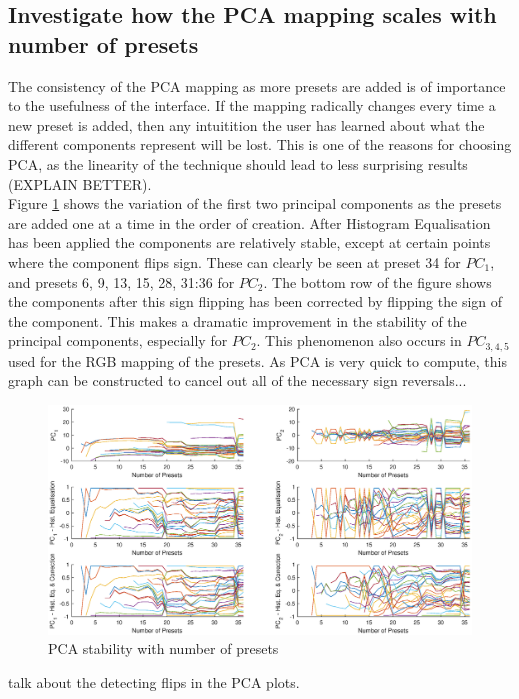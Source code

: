 \documentclass[11pt, oneside]{report}   	%
\begin{document}
\subsection{Investigate how the PCA mapping scales with number of presets}
The consistency of the PCA mapping as more presets are added is of importance to the usefulness of the interface. If the mapping radically changes every time a new preset is added, then any intuitition the user has learned about what the different components represent will be lost. This is one of the reasons for choosing PCA, as the linearity of the technique should lead to less surprising results (EXPLAIN BETTER).\\
Figure \ref{fig:PCAnumPresets} shows the variation of the first two principal components as the presets are added one at a time in the order of creation. After Histogram Equalisation has been applied the components are relatively stable, except at certain points where the component flips sign. These can clearly be seen at preset 34 for $PC_1$, and presets 6, 9, 13, 15, 28, 31:36 for $PC_2$. The bottom row of the figure shows the components after this sign flipping has been corrected by flipping the sign of the component. This makes a dramatic improvement in the stability of the principal components, especially for $PC_2$. This phenomenon also occurs in $PC_{3,4,5}$ used for the RGB mapping of the presets.
As PCA is very quick to compute, this graph can be constructed to cancel out all of the necessary sign reversals...

\begin{figure}
	\hspace{-80pt}
	\includegraphics[width = 8.5in]{PCAnumPresets1.eps}
	\caption{PCA stability with number of presets}
	\label{fig:PCAnumPresets}
\end{figure}
talk about the detecting flips in the PCA plots. 
\end{document}
